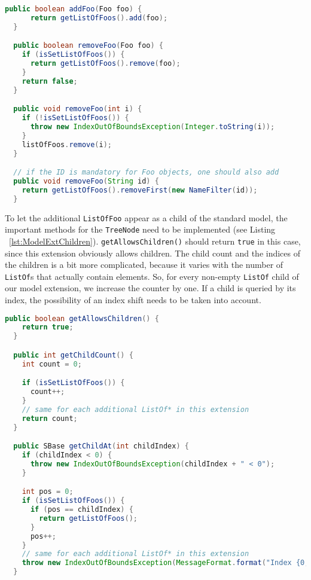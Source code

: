 \begin{lstlisting}[language=Java,caption={Implementation of ListOf methods \texttt{addFoo(Foo foo)}, \texttt{removeFoo(Foo foo)}, \texttt{removeFoo(int i)}},label={lst:ModelExtAddRemoveFoos}]
  public boolean addFoo(Foo foo) {
      return getListOfFoos().add(foo);
  }

  public boolean removeFoo(Foo foo) {
    if (isSetListOfFoos()) {
      return getListOfFoos().remove(foo);
    }
    return false;
  }

  public void removeFoo(int i) {
    if (!isSetListOfFoos()) {
      throw new IndexOutOfBoundsException(Integer.toString(i));
    }
    listOfFoos.remove(i);
  }

  // if the ID is mandatory for Foo objects, one should also add
  public void removeFoo(String id) {
    return getListOfFoos().removeFirst(new NameFilter(id));
  }
\end{lstlisting}

To let the additional \texttt{ListOfFoo} appear as a child of the standard model, the important methods for the \texttt{TreeNode} need to be implemented (see Listing ~\vref{lst:ModelExtChildren}).
\texttt{getAllowsChildren()} should return \texttt{true} in this case, since this extension obviously allows children.
The child count and the indices of the children is a bit more complicated, because it varies with the number of \texttt{ListOf}s that actually contain elements.
So, for every non-empty \texttt{ListOf} child of our model extension, we increase the counter by one.
If a child is queried by its index, the possibility of an index shift needs to be taken into account.

\begin{lstlisting}[language=Java,caption={Methods which need to be implemented to make the children available in the extended model},label={lst:ModelExtChildren}]
  public boolean getAllowsChildren() {
    return true;
  }

  public int getChildCount() {
    int count = 0;

    if (isSetListOfFoos()) {
      count++;
    }
    // same for each additional ListOf* in this extension
    return count;
  }

  public SBase getChildAt(int childIndex) {
    if (childIndex < 0) {
      throw new IndexOutOfBoundsException(childIndex + " < 0");
    }

    int pos = 0;
    if (isSetListOfFoos()) {
      if (pos == childIndex) {
        return getListOfFoos();
      }
      pos++;
    }
    // same for each additional ListOf* in this extension
    throw new IndexOutOfBoundsException(MessageFormat.format("Index {0,number,integer} >= {1,number,integer}", childIndex, +((int) Math.min(pos, 0))));
  }
\end{lstlisting}



